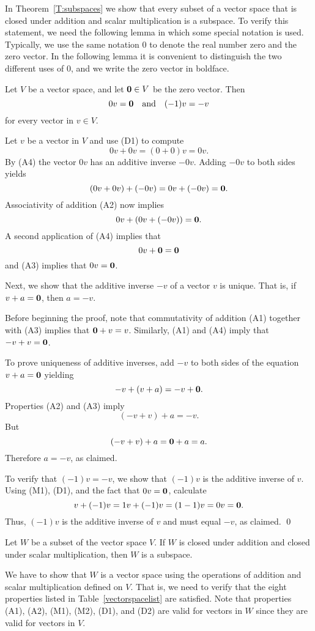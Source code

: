 In Theorem~\ref{T:subspaces} we show that every subset of a vector space 
that is closed under addition and scalar multiplication is a subspace.  
To verify this statement, we need the following lemma in which some special 
notation is used.  Typically, we use the same notation $0$ to denote the
real number zero and the zero vector.  In the following
lemma it is convenient to distinguish the two different uses of $0$, and we 
write the zero vector in boldface.

\begin{lemma}  \label{lem:AddId}
Let $V$ be a vector space, and let ${\bf 0}\in V$ be the zero vector.  Then
\[
0v={\bf 0} \quad \mbox{and}\quad (-1)v=-v
\]
for every vector in $v\in V$.
\end{lemma}

\proof Let $v$ be a vector in $V$ and use (D1) to compute
\[
     0v + 0v  = (0+0)v = 0v.
\]
By (A4) the vector $0v$ has an additive inverse $-0v$.  Adding $-0v$ 
to both sides yields 
\[
(0v + 0v) + (-0v) = 0v + (-0v) = {\bf 0}.
\] 
Associativity of addition (A2) now implies 
\[
0v + (0v + (-0v)) = {\bf 0}.
\]
A second application of (A4) implies that 
\[
0v + {\bf 0} = {\bf 0}
\]
and (A3) implies that $0v={\bf 0}$.

Next, we show that the additive inverse $-v$ of a vector $v$ is unique. 
That is, if $v + a = {\bf 0}$, then $a=-v$.  

Before beginning the proof, note that commutativity of addition (A1) together 
with (A3) implies that ${\bf 0}+v=v$.  Similarly, (A1) and (A4) imply that 
$-v+v={\bf 0}$.  

To prove uniqueness of additive inverses, add $-v$ to both sides of the 
equation $v + a = {\bf 0}$ yielding 
\[
-v + (v + a) = -v + {\bf 0}. 
\]
Properties (A2) and (A3) imply
\[
(-v + v) + a = -v.
\]
But 
\[
(-v + v) + a = {\bf 0} + a = a.
\]
Therefore $a = -v$, as claimed.

To verify that $(-1)v = -v$, we show that $(-1)v$ is the
additive inverse of $v$.  Using (M1), (D1), and the fact that $0v = {\bf 0}$, 
calculate
\[
     v + (-1)v = 1v + (-1)v =(1-1)v = 0v = {\bf 0}.
\]
Thus, $(-1)v$ is the additive inverse of $v$ and must equal $-v$, as
claimed.  \qed

\begin{thm}  \label{T:subspaces}
Let $W$ be a subset of the vector space $V$. If $W$ is closed under addition 
and closed under scalar multiplication, then $W$ is a subspace.
\end{thm}
\proof  We have to show that $W$ is a vector space using the operations 
of addition and scalar multiplication defined on $V$.  That is, we need to
verify that the eight properties listed in Table~\ref{vectorspacelist} are 
satisfied.  Note that properties (A1), (A2), (M1), (M2), (D1), and (D2) are 
valid for vectors in $W$ since they are valid for vectors in $V$.

